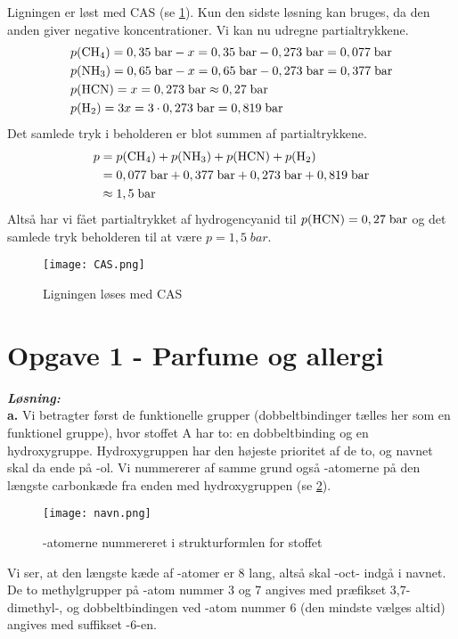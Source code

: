 \documentclass{report}
\newcommand{\sol}{\setlength{\parindent}{0cm}\textbf{\textit{Løsning:}}\setlength{\parindent}{1cm}}
\begin{document}
Ligningen er løst med CAS (se \cref{fig:CAS}).
Kun den sidste løsning kan bruges, da den anden giver negative koncentrationer.
Vi kan nu udregne partialtrykkene.
\begin{equation*}
\begin{split}
  &p(\ce{CH4})=0,35 \;\unit{bar} - x=0,35 \;\unit{bar} - 0,273 \;\unit{bar} = 0,077 \;\unit{bar} \\
  &p(\ce{NH3} )=0,65 \;\unit{bar} - x=0,65 \;\unit{bar} - 0,273 \;\unit{bar} =0,377 \;\unit{bar} \\
  &p(\ce{HCN} )=x=0,273 \;\unit{bar} \approx 0,27 \;\unit{bar}  \\
  &p(\ce{H2} )=3x=3 \cdot 0,273 \;\unit{bar} =0,819 \;\unit{bar} 
\end{split}
\end{equation*}
Det samlede tryk i beholderen er blot summen af partialtrykkene.
\begin{equation*}
\begin{split}
  p&=p(\ce{CH4}) + p(\ce{NH3}) + p(\ce{HCN}) + p(\ce{H2})\\
  &=0,077 \;\unit{bar}  + 0,377 \;\unit{bar}  + 0,273 \;\unit{bar} + 0,819 \;\unit{bar} \\
  &\approx 1,5 \;\unit{bar} 
\end{split}
\end{equation*}
Altså har vi fået partialtrykket af hydrogencyanid til $p(\ce{HCN} )=0,27 \;\unit{bar} $ og det samlede tryk beholderen til at være $p=1,5 \;\unit{bar} $. 
\begin{figure}[H]
\begin{center}
  \texttt{[image: CAS.png]}
\end{center}
\caption{Ligningen løses med CAS}
\label{fig:CAS}
\end{figure}
\section*{Opgave 1 - Parfume og allergi}
\sol \\
\textbf{a.}
Vi betragter først de funktionelle grupper (dobbeltbindinger tælles her som en funktionel gruppe), hvor stoffet A har to: en dobbeltbinding og en hydroxygruppe.
Hydroxygruppen har den højeste prioritet af de to, og navnet skal da ende på -ol. 
Vi nummererer af samme grund også -atomerne på den længste carbonkæde fra enden med hydroxygruppen (se \cref{fig:navn}).
\begin{figure}[H]
\begin{center}
  \texttt{[image: navn.png]}
\end{center}
\caption{-atomerne nummereret i strukturformlen for stoffet}
\label{fig:navn}
\end{figure}
Vi ser, at den længste kæde af -atomer er 8 lang, altså skal -oct- indgå i navnet.
De to methylgrupper på -atom nummer 3 og 7 angives med præfikset 3,7-dimethyl-, og dobbeltbindingen ved -atom nummer 6 (den mindste vælges altid) angives med suffikset -6-en.
\end{document}
